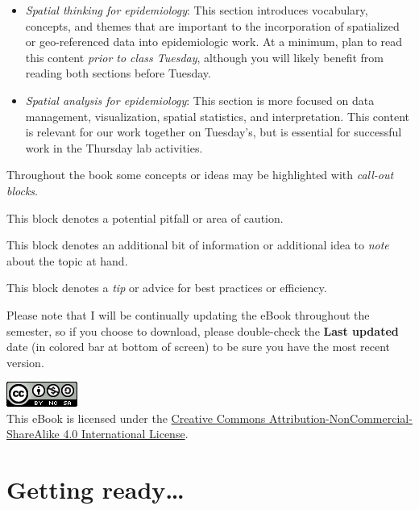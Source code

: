 \documentclass[
]{book}
\providecommand{\tightlist}{%
  \setlength{\itemsep}{0pt}\setlength{\parskip}{0pt}}
\newenvironment{rmdcaution}[1]
  {
  \begin{itemize}
  \renewcommand{\labelitemi}{
    \raisebox{-.7\height}[0pt][0pt]{
      {\setkeys{Gin}{width=3em,keepaspectratio}\texttt{[image: images/\#1]}}
    }
  }
  \setlength{\fboxsep}{1em}
  \begin{caution}
  \item
  }
  {
  \end{caution}
  \end{itemize}
  }
\newenvironment{rmdnote}[1]
  {
  \begin{itemize}
  \renewcommand{\labelitemi}{
    \raisebox{-.7\height}[0pt][0pt]{
      {\setkeys{Gin}{width=3em,keepaspectratio}\texttt{[image: images/\#1]}}
    }
  }
  \setlength{\fboxsep}{1em}
  \begin{note}
  \item
  }
  {
  \end{note}
  \end{itemize}
  }
\newenvironment{rmdtip}[1]
  {
  \begin{itemize}
  \renewcommand{\labelitemi}{
    \raisebox{-.7\height}[0pt][0pt]{
      {\setkeys{Gin}{width=3em,keepaspectratio}\texttt{[image: images/\#1]}}
    }
  }
  \setlength{\fboxsep}{1em}
  \begin{tip}
  \item
  }
  {
  \end{tip}
  \end{itemize}
  }
\begin{document}
\begin{itemize}
\tightlist
\item
  \emph{Spatial thinking for epidemiology}: This section introduces vocabulary, concepts, and themes that are important to the incorporation of spatialized or geo-referenced data into epidemiologic work. At a minimum, plan to read this content \emph{prior to class Tuesday}, although you will likely benefit from reading both sections before Tuesday.
\item
  \emph{Spatial analysis for epidemiology}: This section is more focused on data management, visualization, spatial statistics, and interpretation. This content is relevant for our work together on Tuesday's, but is essential for successful work in the Thursday lab activities.
\end{itemize}

Throughout the book some concepts or ideas may be highlighted with \emph{call-out blocks}.

\begin{rmdcaution}{caution}
This block denotes a potential pitfall or area of caution.

\end{rmdcaution}

\begin{rmdnote}{note}
This block denotes an additional bit of information or additional idea to \emph{note} about the topic at hand.

\end{rmdnote}

\begin{rmdtip}{tip}
This block denotes a \emph{tip} or advice for best practices or efficiency.

\end{rmdtip}

Please note that I will be continually updating the eBook throughout the semester, so if you choose to download, please double-check the \textbf{Last updated} date (in colored bar at bottom of screen) to be sure you have the most recent version.

\includegraphics{images/by-nc-sa.png}\\
This eBook is licensed under the \href{http://creativecommons.org/licenses/by-nc-sa/4.0/}{Creative Commons Attribution-NonCommercial-ShareAlike 4.0 International License}.

\hypertarget{part-getting-ready}{%
\part{Getting ready\ldots{}}\label{part-getting-ready}}
\end{document}
